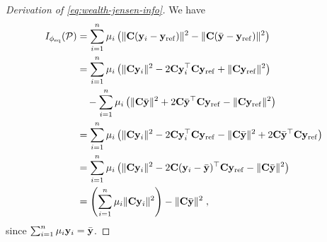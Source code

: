 \begin{proof}[Derivation of \cref{eq:wealth-jensen-info}]
  We have 
  \begin{align*}
    I_{\phi_{\mathrm{eq}}}(\pop) &= \sum_{i = 1}^n \mu_i \paren{\norm{\mC(\vy_i - \vyref)}^2 - \norm{\mC(\bar{\vy} - \vyref)}^2} \\
    &= \sum_{i = 1}^n \mu_i \paren{\norm{\mC\vy_i}^2 - 2\inner{\mC\vy_i}{\mC\vyref} + \norm{\mC\vyref}^2} \\ 
    &\quad - \sum_{i = 1}^n \mu_i\paren{\norm{\mC\bar{\vy}}^2 + 2\inner{\mC\bar{\vy}}{\mC\vyref} - \norm{\mC\vyref}^2} \\
    &= \sum_{i = 1}^n \mu_i \paren{\norm{\mC\vy_i}^2 - 2\inner{\mC\vy_i}{\mC\vyref} - \norm{\mC\bar{\vy}}^2 + 2\inner{\mC\bar{\vy}}{\mC\vyref}} \\
    &= \sum_{i = 1}^n \mu_i \paren{\norm{\mC\vy_i}^2 - 2\inner{\mC(\vy_i - \bar{\vy})}{\mC\vyref} - \norm{\mC\bar{\vy}}^2 }\\
    &= \paren{\sum_{i = 1}^n \mu_i \norm{\mC\vy_i}^2} - \norm{\mC\bar{\vy}}^2 \;,
  \end{align*}
  since $\sum_{i = 1}^n \mu_i \vy_i = \bar{\vy}$. 
\end{proof}